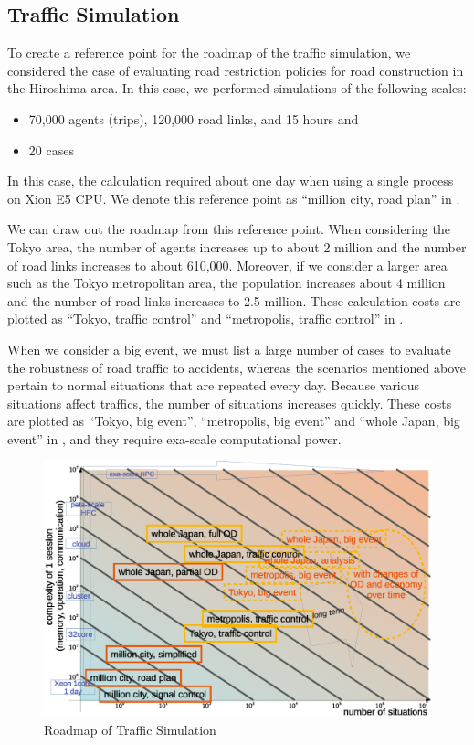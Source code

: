 \subsection{Traffic Simulation}

To create a reference point for the roadmap of the traffic
simulation,
we considered the case of evaluating road restriction policies
for road construction in the Hiroshima area\cite{Osogami2013b}.
In this case, we performed simulations of the following scales:
\begin{itemize}
  \item 70,000 agents (trips), 120,000 road links, and 15 hours and
  \item 20 cases
\end{itemize}
In this case, the calculation required about one day when using a single process
on Xion E5 CPU.
We denote this reference point as ``million city, road plan''
in .

We can draw out the roadmap from this reference point.
When considering the Tokyo area,
the number of agents increases up to about 2 million
and the number of road links increases to about 610,000.
Moreover, if we consider a larger area such as the Tokyo metropolitan area,
the population increases about 4 million and the number of road links increases to 2.5 million.
These calculation costs are plotted as ``Tokyo, traffic
control'' and ``metropolis, traffic control'' in
.

When we consider a big event,
we must list a large number of cases to evaluate the robustness
of road traffic to accidents,
whereas the scenarios mentioned above pertain to normal situations
that are repeated every day.
Because various situations affect traffics,
the number of situations increases quickly.
These costs are plotted as 
``Tokyo, big event'', ``metropolis, big event'' and ``whole Japan, big
event''
in , and they require exa-scale computational power.


\begin{figure}
  \centering
  \includegraphics[width=.60\linewidth]{Figs.noda/figure2-5.eps}
  \caption{Roadmap of Traffic Simulation}
  \label{fig:Figure-5}
\end{figure}


